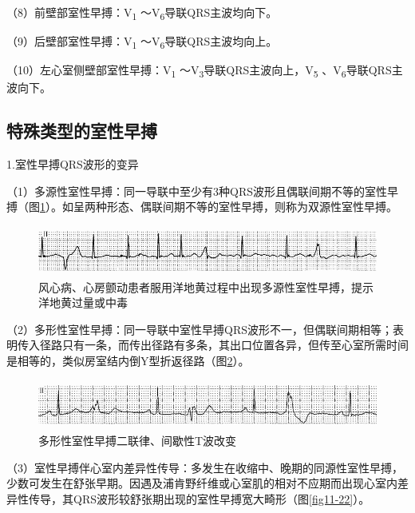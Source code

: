 （8）前壁部室性早搏：V\textsubscript{1} ～V\textsubscript{6}导联QRS主波均向下。

（9）后壁部室性早搏：V\textsubscript{1} ～V\textsubscript{6}导联QRS主波均向上。

（10）左心室侧壁部室性早搏：V\textsubscript{1} ～V\textsubscript{3}导联QRS主波向上，V\textsubscript{5} 、V\textsubscript{6}导联QRS主波向下。

\protect\hypertarget{text00018.htmlux5cux23subid153}{}{}

\subsection{特殊类型的室性早搏}

1.室性早搏QRS波形的变异

（1）多源性室性早搏：同一导联中至少有3种QRS波形且偶联间期不等的室性早搏（图\ref{fig11-20}）。如呈两种形态、偶联间期不等的室性早搏，则称为双源性室性早搏。

\begin{figure}[!htbp]
 \centering
 \includegraphics[width=5.58333in,height=0.64583in]{./images/Image00180.jpg}
 \captionsetup{justification=centering}
 \caption{风心病、心房颤动患者服用洋地黄过程中出现多源性室性早搏，提示洋地黄过量或中毒}
 \label{fig11-20}
  \end{figure} 

（2）多形性室性早搏：同一导联中室性早搏QRS波形不一，但偶联间期相等；表明传入径路只有一条，而传出径路有多条，其出口位置各异，但传至心室所需时间是相等的，类似房室结内倒Y型折返径路（图\ref{fig11-21}）。

\begin{figure}[!htbp]
 \centering
 \includegraphics[width=5.58333in,height=0.64583in]{./images/Image00181.jpg}
 \captionsetup{justification=centering}
 \caption{多形性室性早搏二联律、间歇性T波改变}
 \label{fig11-21}
  \end{figure} 

（3）室性早搏伴心室内差异性传导：多发生在收缩中、晚期的同源性室性早搏，少数可发生在舒张早期。因遇及浦肯野纤维或心室肌的相对不应期而出现心室内差异性传导，其QRS波形较舒张期出现的室性早搏宽大畸形（图\ref{fig11-22}）。

